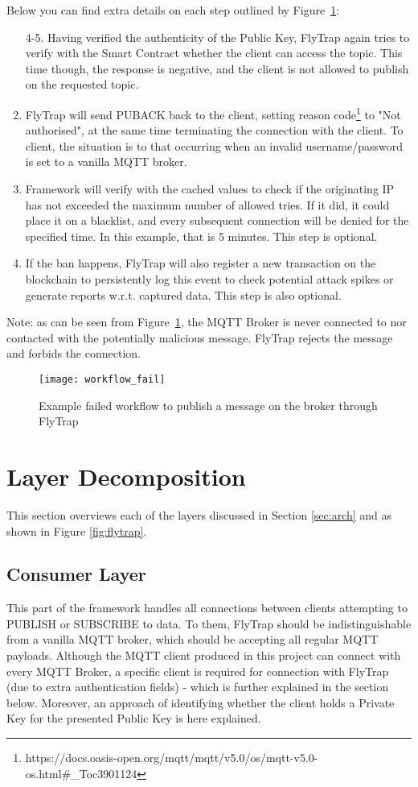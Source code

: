 Below you can find extra details on each step outlined by Figure~\ref{fig:workflow_fail}:
\begin{enumerate}\addtocounter{enumi}{4}
    \item[4-5.] Having verified the authenticity of the Public Key, FlyTrap again tries to verify with the Smart Contract whether the client can access the topic. This time though, the response is negative, and the client is not allowed to publish on the requested topic.
    \item FlyTrap will send PUBACK back to the client, setting reason code\footnote{https://docs.oasis-open.org/mqtt/mqtt/v5.0/os/mqtt-v5.0-os.html\#\_Toc3901124} to "Not authorised", at the same time terminating the connection with the client. To client, the situation is to that occurring when an invalid username/password is set to a vanilla MQTT broker.
    \item Framework will verify with the cached values to check if the originating IP has not exceeded the maximum number of allowed tries. If it did, it could place it on a blacklist, and every subsequent connection will be denied for the specified time. In this example, that is 5 minutes. This step is optional.
    \item If the ban happens, FlyTrap will also register a new transaction on the blockchain to persistently log this event to check potential attack spikes or generate reports w.r.t.  captured data. This step is also optional.
\end{enumerate}

Note: as can be seen from Figure~\ref{fig:workflow_fail}, the MQTT Broker is never connected to nor contacted with the potentially malicious message. FlyTrap rejects the message and forbids the connection. 
\begin{figure}[h]
    \centering
    \texttt{[image: workflow\_fail]}
    \caption{Example failed workflow to publish a message on the broker through FlyTrap}
    \label{fig:workflow_fail}
\end{figure}

\section{Layer Decomposition}
This section overviews each of the layers discussed in Section \ref{sec:arch} and as shown in Figure \ref{fig:flytrap}.
\subsection{Consumer Layer}
This part of the framework handles all connections between clients attempting to PUBLISH or SUBSCRIBE to data. To them, FlyTrap should be indistinguishable from a vanilla MQTT broker, which should be accepting all regular MQTT payloads. Although the MQTT client produced in this project can connect with every MQTT Broker, a specific client is required for connection with FlyTrap (due to extra authentication fields) - which is further explained in the section below. Moreover, an approach of identifying whether the client holds a Private Key for the presented Public Key is here explained. 
